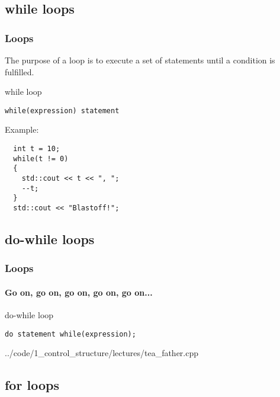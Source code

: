\documentclass{beamer}
\begin{document}
\subsection{while loops}

\begin{frame}[fragile]
  \frametitle{Loops}
  The purpose of a loop is to execute a set of statements until a condition is fulfilled.
  \begin{block}{while loop}
    \begin{lstlisting}
while(expression) statement
    \end{lstlisting}
    Example:
  \begin{lstlisting}
  int t = 10;
  while(t != 0)
  {
    std::cout << t << ", ";
    --t;  
  }
  std::cout << "Blastoff!";
  \end{lstlisting}
  \end{block}
\end{frame}

\subsection{do-while loops}

\begin{frame}[fragile]
  \frametitle{Loops}
  \framesubtitle{Go on, go on, go on, go on, go on...}
  
  \begin{block}{do-while loop}
    \begin{lstlisting}
do statement while(expression);
    \end{lstlisting}
    {../code/1_control_structure/lectures/tea_father.cpp}
  \end{block}
\end{frame}

\subsection{for loops}
\end{document}
